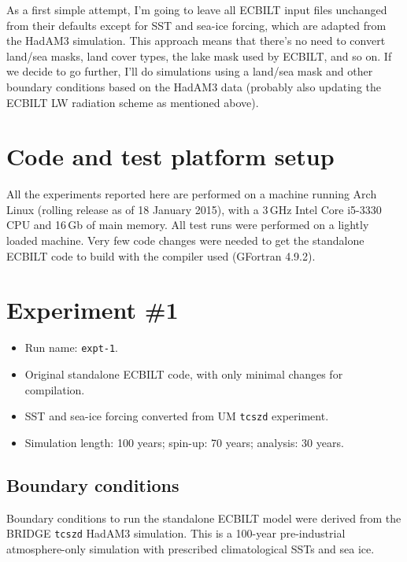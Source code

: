 \documentclass[a4paper,11pt,article]{article}
\begin{document}
As a first simple attempt, I'm going to leave all ECBILT input files
unchanged from their defaults except for SST and sea-ice forcing,
which are adapted from the HadAM3 simulation.  This approach means
that there's no need to convert land/sea masks, land cover types, the
lake mask used by ECBILT, and so on.  If we decide to go further, I'll
do simulations using a land/sea mask and other boundary conditions
based on the HadAM3 data (probably also updating the ECBILT LW
radiation scheme as mentioned above).


\section{Code and test platform setup}

All the experiments reported here are performed on a machine running
Arch Linux (rolling release as of 18 January 2015), with a 3\,GHz
Intel Core i5-3330 CPU and 16\,Gb of main memory.  All test runs were
performed on a lightly loaded machine.  Very few code changes were
needed to get the standalone ECBILT code to build with the compiler
used (GFortran 4.9.2).


\section{Experiment \#1}

\begin{itemize}
  \item{Run name: \texttt{expt-1}.}
  \item{Original standalone ECBILT code, with only minimal changes for
    compilation.}
  \item{SST and sea-ice forcing converted from UM \texttt{tcszd}
    experiment.}
  \item{Simulation length: 100 years; spin-up: 70 years; analysis: 30
    years.}
\end{itemize}

\subsection{Boundary conditions}

Boundary conditions to run the standalone ECBILT model were derived
from the BRIDGE \texttt{tcszd} HadAM3 simulation.  This is a 100-year
pre-industrial atmosphere-only simulation with prescribed
climatological SSTs and sea ice.
\end{document}
